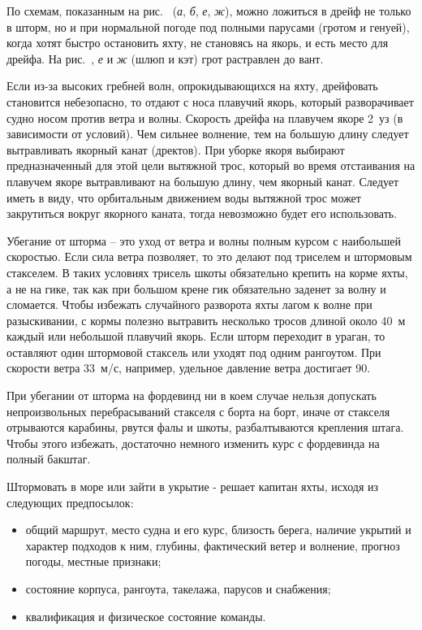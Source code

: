 По схемам, показанным на рис.~ (\textit{а}, \textit{б}, \textit{е}, \textit{ж}), можно ложиться в дрейф не только в шторм, но и при нормальной погоде под полными парусами (гротом и генуей), когда хотят быстро остановить яхту, не становясь на якорь, и есть место для дрейфа. На рис.~, \textit{е} и \textit{ж} (шлюп и кэт) грот растравлен до вант.

Если из-за высоких гребней волн, опрокидывающихся на яхту, дрейфовать становится небезопасно, то отдают с носа плавучий якорь, который разворачивает судно носом против ветра и волны. Скорость дрейфа на плавучем якоре 2~уз (в зависимости от условий). Чем сильнее волнение, тем на большую длину следует вытравливать якорный канат (дректов). При уборке якоря выбирают предназначенный для этой цели вытяжной трос, который во время отстаивания на плавучем якоре вытравливают на большую длину, чем якорный канат. Следует иметь в виду, что орбитальным движением воды вытяжной трос может закрутиться вокруг якорного каната, тогда невозможно будет его использовать. 

Убегание от шторма \--- это уход от ветра и волны полным курсом с наибольшей скоростью. Если сила ветра позволяет, то это делают под триселем и штормовым стакселем. В таких условиях трисель шкоты обязательно крепить на корме яхты, а не на гике, так как при большом крене гик обязательно заденет за волну и сломается. Чтобы избежать случайного разворота яхты лагом к волне при разыскивании, с кормы полезно вытравить несколько тросов длиной около 40~м каждый или небольшой плавучий якорь. Если шторм переходит в ураган, то оставляют один штормовой стаксель или уходят под одним рангоутом. При скорости ветра 33~м/с, например, удельное давление ветра достигает 90\kgmsq. 

При убегании от шторма на фордевинд ни в коем случае нельзя допускать непроизвольных перебрасываний стакселя с борта на борт, иначе от стакселя отрываются карабины, рвутся фалы и шкоты, разбалтываются крепления штага. Чтобы этого избежать, достаточно немного изменить курс с фордевинда на полный бакштаг.

Штормовать в море или зайти в укрытие - решает капитан яхты, исходя из следующих предпосылок: 
\begin{itemize}
\item общий маршрут, место судна и его курс, близость берега, наличие укрытий и характер подходов к ним, глубины, фактический ветер и волнение, прогноз погоды, местные признаки; 
\item состояние корпуса, рангоута, такелажа, парусов и снабжения; 
\item квалификация и физическое состояние команды. 
\end{itemize}

